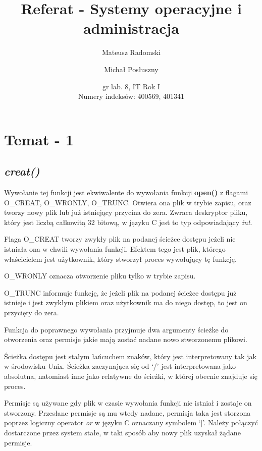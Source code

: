 \documentclass{article}
\title{Referat - Systemy operacyjne i administracja}
\author{Mateusz Radomski \and Michał Posłuszny}
\date{gr lab. 8, IT Rok I \\ Numery indeksów: 400569, 401341 }
\begin{document}
\maketitle

\section{Temat - 1}
\subsection{\textit{creat()}}
Wywołanie tej funkcji jest ekwiwalente do wywołania funkcji \textbf{open()} z flagami O\_CREAT, O\_WRONLY, O\_TRUNC. Otwiera ona plik w trybie zapisu, oraz tworzy nowy plik lub już istniejący przycina do zera. Zwraca deskryptor pliku, który jest liczbą całkowitą 32 bitową, w języku C jest to typ odpowiadający \textit{int}.

Flaga O\_CREAT tworzy zwykły plik na podanej ścieżce dostępu jeżeli nie istniała ona w chwili wywołania funkcji. Efektem tego jest plik, którego właścicielem jest użytkownik, który stworzył proces wywołujący tę funkcję.

O\_WRONLY oznacza otworzenie pliku tylko w trybie zapisu.

O\_TRUNC informuje funkcję, że jeżeli plik na podanej ścieżce dostępu już istnieje i jest zwykłym plikiem oraz użytkownik ma do niego dostęp, to jest on przycięty do zera.

Funkcja do poprawnego wywołania przyjmuje dwa argumenty ścieżke do otworzenia oraz permisje jakie mają zostać nadane nowo stworzonemu plikowi.

Ścieżka dostępu jest stałym łańcuchem znaków, który jest interpretowany tak jak w środowisku Unix.
Ścieżka zaczynająca się od `/' jest interpretowana jako absolutna, natomiast inne jako relatywne do
ścieżki, w której obecnie znajduje się proces.

Permisje są używane gdy plik w czasie wywołania funkcji nie istniał i zostaje on stworzony.
Przesłane permisje są mu wtedy nadane, permisja taka jest storzona poprzez logiczny operator
\textit{or} w języku C oznaczany symbolem `|'. Należy połączyć dostarczone przez system stałe,
w taki sposób aby nowy plik uzyskał żądane permisje.
\end{document}
